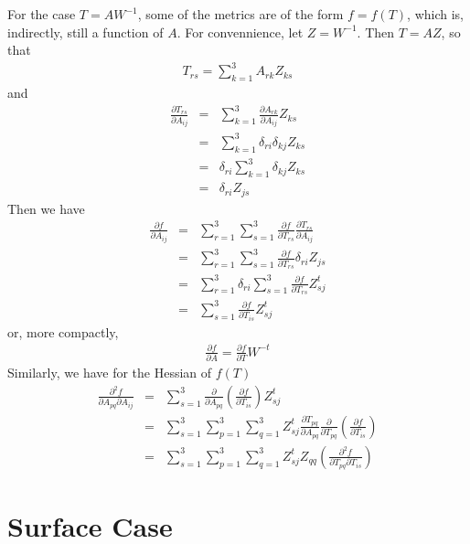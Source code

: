  \newline
For the case $T = A W^{-1}$, some of the metrics are of the form $f=f(T)$,
which is, indirectly, still a function of $A$.  For convennience, let
$Z = W^{-1}$.  Then $T = A Z$, so that 
\begin{eqnarray}
T_{rs} = \sum_{k=1}^3 A_{rk} Z_{ks}
\end{eqnarray}
and 
\begin{eqnarray}
\frac{\partial T_{rs}}{\partial A_{ij}} & = & \sum_{k=1}^3 \frac{\partial A_{rk}}{\partial A_{ij}} Z_{ks} \\
 & = & \sum_{k=1}^3 \delta_{ri} \delta_{kj} Z_{ks} \\
 & = & \delta_{ri} \sum_{k=1}^3 \delta_{kj} Z_{ks} \\
 & = & \delta_{ri} Z_{js}
\end{eqnarray}
Then we have
\begin{eqnarray}
\frac{\partial f}{\partial A_{ij}} & = & \sum_{r=1}^3 \sum_{s=1}^3 \frac{\partial f}{\partial T_{rs}} \frac{\partial T_{rs}}{\partial A_{ij}} \\
 & = & \sum_{r=1}^3 \sum_{s=1}^3 \frac{\partial f}{\partial T_{rs}} \delta_{ri} Z_{js} \\
 & = & \sum_{r=1}^3 \delta_{ri} \sum_{s=1}^3 \frac{\partial f}{\partial T_{rs}} Z_{sj}^t \\
 & = & \sum_{s=1}^3 \frac{\partial f}{\partial T_{is}} Z_{sj}^t 
\end{eqnarray}
or, more compactly,
\begin{eqnarray}
\frac{\partial f}{\partial A} = \frac{\partial f}{\partial T} W^{-t}
\end{eqnarray}
Similarly, we have for the Hessian of $f(T)$
\begin{eqnarray}
\frac{\partial^2 f}{\partial A_{pq} \partial A_{ij}} & = & \sum_{s=1}^3 \frac{\partial}{\partial A_{pq}} \left( \frac{\partial f}{\partial T_{is}} \right) Z_{sj}^t \\
 & = & \sum_{s=1}^3 \sum_{p=1}^3 \sum_{q=1}^3  Z_{sj}^t \frac{\partial T_{pq}}{\partial A_{pq}}  \frac{\partial}{\partial T_{pq}} \left( \frac{\partial f}{\partial T_{is}} \right) \\
 & = & \sum_{s=1}^3 \sum_{p=1}^3 \sum_{q=1}^3  Z_{sj}^t Z_{qq} \left( \frac{\partial^2 f}{\partial T_{pq} \partial T_{is}} \right)
\end{eqnarray}

\section{Surface Case}

